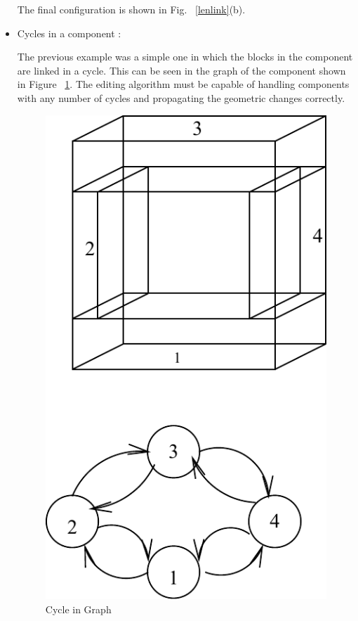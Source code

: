 \begin{itemize}
	The final configuration is shown in Fig. ~\ref{lenlink}(b).

	\item
	Cycles in a component :


	The previous example was a simple one in which the blocks in the 
	component are linked in a cycle. This can be seen in the graph of the 
	component shown in Figure ~\ref{cylegra}. The editing algorithm must be
	capable of handling components with any number of cycles and propagating
	the geometric changes correctly.

        \begin{figure}[htbp]
	\hspace{4cm}
	\includegraphics{IYAD28.pdf}
            \caption{Cycle in Graph}
            \label{cylegra}
        \end{figure}
 


\end{itemize}
